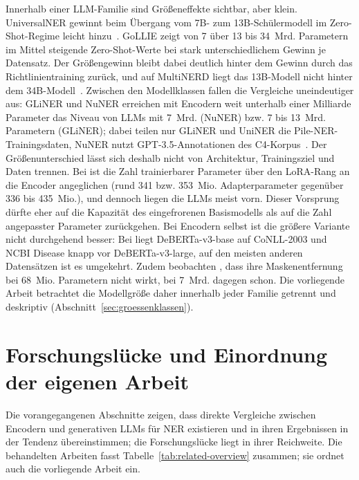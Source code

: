 Innerhalb einer LLM-Familie sind Größeneffekte sichtbar, aber klein.
UniversalNER gewinnt beim Übergang vom 7B- zum 13B-Schülermodell im
Zero-Shot-Regime leicht hinzu~\cite{zhou2024universalner}.
GoLLIE zeigt von 7 über 13 bis 34~Mrd. Parametern im Mittel steigende
Zero-Shot-Werte bei stark unterschiedlichem Gewinn je Datensatz.
Der Größengewinn bleibt dabei deutlich hinter dem Gewinn durch das
Richtlinientraining zurück, und auf MultiNERD liegt das 13B-Modell nicht
hinter dem 34B-Modell~\cite{sainz2024gollie}.
Zwischen den Modellklassen fallen die Vergleiche uneindeutiger aus:
GLiNER und NuNER erreichen mit Encodern weit unterhalb einer Milliarde
Parameter das Niveau von LLMs mit 7~Mrd. (NuNER) bzw. 7 bis 13~Mrd.
Parametern (GLiNER); dabei teilen nur GLiNER und UniNER die
Pile-NER-Trainingsdaten, NuNER nutzt GPT-3.5-Annotationen des
C4-Korpus~\cite{zaratiana2024gliner,bogdanov2024nuner}.
Der Größenunterschied lässt sich deshalb nicht von Architektur,
Trainingsziel und Daten trennen.
Bei \textcite{obeidat2025llm} ist die Zahl trainierbarer Parameter über
den LoRA-Rang an die Encoder angeglichen (rund 341 bzw. 353~Mio.
Adapterparameter gegenüber 336 bis 435~Mio.), und dennoch liegen die
LLMs meist vorn.
Dieser Vorsprung dürfte eher auf die Kapazität des eingefrorenen
Basismodells als auf die Zahl angepasster Parameter zurückgehen.
Bei Encodern selbst ist die größere Variante nicht durchgehend besser:
Bei \textcite{keraghel2024recent} liegt DeBERTa-v3-base auf CoNLL-2003
und NCBI Disease knapp vor DeBERTa-v3-large, auf den meisten anderen
Datensätzen ist es umgekehrt.
Zudem beobachten \textcite{dukic2024lookingright}, dass ihre
Maskenentfernung bei 68~Mio. Parametern nicht wirkt, bei 7~Mrd. dagegen
schon.
Die vorliegende Arbeit betrachtet die Modellgröße daher innerhalb jeder
Familie getrennt und deskriptiv
(Abschnitt~\ref{sec:groessenklassen}).

\section[Forschungslücke und Einordnung der eigenen Arbeit]{Forschungslücke und Einordnung der \mbox{eigenen} Arbeit}
\label{sec:research_gap}

Die vorangegangenen Abschnitte zeigen, dass direkte Vergleiche zwischen
Encodern und generativen LLMs für NER existieren und in ihren
Ergebnissen in der Tendenz übereinstimmen; die Forschungslücke liegt in
ihrer Reichweite.
Die behandelten Arbeiten fasst Tabelle~\ref{tab:related-overview}
zusammen; sie ordnet auch die vorliegende Arbeit ein.

